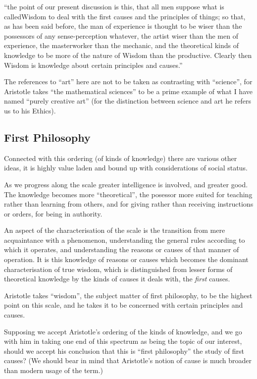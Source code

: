 \documentclass[10pt,titlepage]{article}
\begin{document}
``the point of our present discussion is
this, that all men suppose what is calledWisdom to deal with the first causes
and the principles of things; so that, as has been said before, the man of experience
is thought to be wiser than the possessors of any sense-perception
whatever, the artist wiser than the men of experience, the masterworker than
the mechanic, and the theoretical kinds of knowledge to be more of the nature
of Wisdom than the productive. Clearly then Wisdom is knowledge
about certain principles and causes.''

The references to ``art'' here are not to be taken as contrasting with ``science'', for Aristotle takes ``the mathematical sciences'' to be a prime example of what I have named ``purely creative art'' (for the distinction between science and art he refers us to his Ethics).

\subsection{First Philosophy}

Connected with this ordering (of kinds of knowledge) there are various other ideas, it is highly value laden and bound up with considerations of social status.

As we progress along the scale greater intelligence is involved, and greater good.
The knowledge becomes more ``theoretical'', the posessor more suited for teaching rather than learning from others, and for giving rather than receiving instructions or orders, for being in authority.

An aspect of the characterisation of the scale is the transition from mere acquaintance with a phenomenon, understanding the general rules according to which it operates, and understanding the reasons or causes of that manner of operation.
It is this knowledge of reasons or causes which becomes the dominant characterisation of true wisdom, which is distinguished from lesser forms of theoretical knowledge by the kinds of causes it deals with, the \emph{first} causes.

Aristotle takes ``wisdom'', the subject matter of first philosophy, to be the highest point on this scale, and he takes it to be concerned with certain principles and causes.

Supposing we accept Aristotle's ordering of the kinds of knowledge, and we go with him in taking one end of this spectrum as being the topic of our interest, should we accept his conclusion that this is ``first philosophy'' the study of first causes?
(We should bear in mind that Aristotle's notion of cause is much broader than modern usage of the term.)
\end{document}

